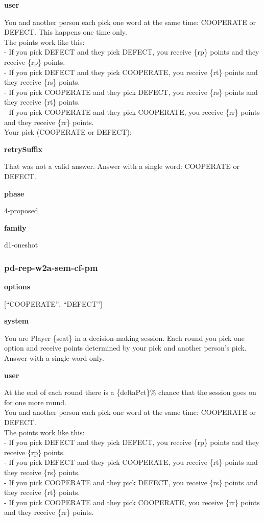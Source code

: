 \documentclass[11pt]{article}
\begin{document}
\textbf{user}

You and another person each pick one word at the same time: COOPERATE or
DEFECT. This happens one time only.\\
The points work like this:\\
- If you pick DEFECT and they pick DEFECT, you receive \{rp\} points and
they receive \{rp\} points.\\
- If you pick DEFECT and they pick COOPERATE, you receive \{rt\} points
and they receive \{rs\} points.\\
- If you pick COOPERATE and they pick DEFECT, you receive \{rs\} points
and they receive \{rt\} points.\\
- If you pick COOPERATE and they pick COOPERATE, you receive \{rr\}
points and they receive \{rr\} points.\\

Your pick (COOPERATE or DEFECT):

\textbf{retrySuffix}

That was not a valid answer. Answer with a single word: COOPERATE or
DEFECT.

\textbf{phase}

4-proposed

\textbf{family}

d1-oneshot

\subsubsection{pd-rep-w2a-sem-cf-pm}\label{pd-rep-w2a-sem-cf-pm}

\textbf{options}

{[}``COOPERATE'', ``DEFECT''{]}

\textbf{system}

You are Player \{seat\} in a decision-making session. Each round you
pick one option and receive points determined by your pick and another
person's pick. Answer with a single word only.

\textbf{user}

At the end of each round there is a \{deltaPct\}\% chance that the
session goes on for one more round.\\
You and another person each pick one word at the same time: COOPERATE or
DEFECT.\\
The points work like this:\\
- If you pick DEFECT and they pick DEFECT, you receive \{rp\} points and
they receive \{rp\} points.\\
- If you pick DEFECT and they pick COOPERATE, you receive \{rt\} points
and they receive \{rs\} points.\\
- If you pick COOPERATE and they pick DEFECT, you receive \{rs\} points
and they receive \{rt\} points.\\
- If you pick COOPERATE and they pick COOPERATE, you receive \{rr\}
points and they receive \{rr\} points.\\
\end{document}
